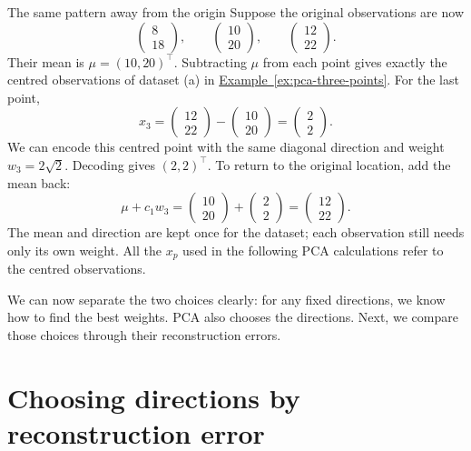 \documentclass[a4paper,12pt,oneside]{report}
\begin{document}
\begin{framedexample}{The same pattern away from the origin}
Suppose the original observations are now
\[
  \begin{pmatrix}8\\18\end{pmatrix},\qquad
  \begin{pmatrix}10\\20\end{pmatrix},\qquad
  \begin{pmatrix}12\\22\end{pmatrix}.
\]
Their mean is $\mu=(10,20)^\top$. Subtracting $\mu$ from each point
gives exactly the centred observations of dataset (a) in
\hyperref[ex:pca-three-points]{Example~\ref*{ex:pca-three-points}}.
For the last point,
\[
  x_3=\begin{pmatrix}12\\22\end{pmatrix}
       -\begin{pmatrix}10\\20\end{pmatrix}
      =\begin{pmatrix}2\\2\end{pmatrix}.
\]
We can encode this centred point with the same diagonal direction
and weight $w_3=2\sqrt2$. Decoding gives $(2,2)^\top$.
To return to the original location, add the mean back:
\[
  \mu+c_1w_3
   =\begin{pmatrix}10\\20\end{pmatrix}
    +\begin{pmatrix}2\\2\end{pmatrix}
   =\begin{pmatrix}12\\22\end{pmatrix}.
\]
The mean and direction are kept once for the dataset; each observation
still needs only its own weight. All the $x_p$ used in the following
PCA calculations refer to the centred observations.
\end{framedexample}

We can now separate the two choices clearly: for any fixed directions,
we know how to find the best weights. PCA also chooses the directions.
Next, we compare those choices through their reconstruction errors.

\section{Choosing directions by reconstruction error}
\end{document}
